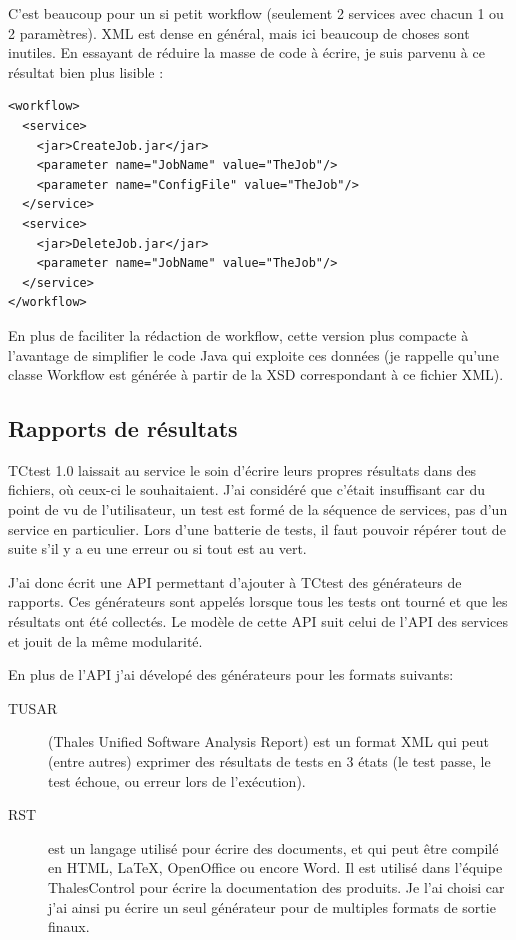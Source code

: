 C'est beaucoup pour un si petit workflow (seulement 2 services avec chacun 1 ou 
2 paramètres). XML est dense en général, mais ici beaucoup de choses sont 
inutiles. En essayant de réduire la masse de code à écrire, je suis parvenu à 
ce résultat bien plus lisible :

\begin{verbatim}
<workflow>
  <service>
    <jar>CreateJob.jar</jar>
    <parameter name="JobName" value="TheJob"/>
    <parameter name="ConfigFile" value="TheJob"/>
  </service>
  <service>
    <jar>DeleteJob.jar</jar>
    <parameter name="JobName" value="TheJob"/>
  </service>
</workflow>
\end{verbatim}

En plus de faciliter la rédaction de workflow, cette version plus compacte à 
l'avantage de simplifier le code Java qui exploite ces données (je rappelle 
qu'une classe Workflow est générée à partir de la XSD correspondant à ce fichier 
XML).

\subsection{Rapports de résultats}
\label{Reporting}

TCtest 1.0 laissait au service le soin d'écrire leurs propres résultats dans 
des fichiers, où ceux-ci le souhaitaient. J'ai considéré que c'était insuffisant
car du point de vu de l'utilisateur, un test est formé de la séquence de 
services, pas d'un service en particulier. Lors d'une batterie de tests, il 
faut pouvoir répérer tout de suite s'il y a eu une erreur ou si tout est au 
vert.

J'ai donc écrit une API permettant d'ajouter à TCtest des générateurs de rapports.
Ces générateurs sont appelés lorsque tous les tests ont tourné et que les 
résultats ont été collectés. Le modèle de cette API suit celui de l'API des 
services et jouit de la même modularité.

En plus de l'API j'ai dévelopé des générateurs pour les formats suivants:
\begin{description}
	\item[TUSAR]{(Thales Unified Software Analysis Report) est un format XML qui peut 
	(entre autres) exprimer des résultats de tests en 3 états (le test passe, 
	le test échoue, ou erreur lors de l'exécution).}
	\item[RST]{est un langage utilisé pour écrire des documents, et qui peut 
	être compilé en HTML, LaTeX, OpenOffice ou encore Word. Il est utilisé dans 
	l'équipe ThalesControl pour écrire la documentation des produits. Je l'ai 
	choisi car j'ai ainsi pu écrire un seul générateur pour de multiples formats
	de sortie finaux.}
\end{description}

